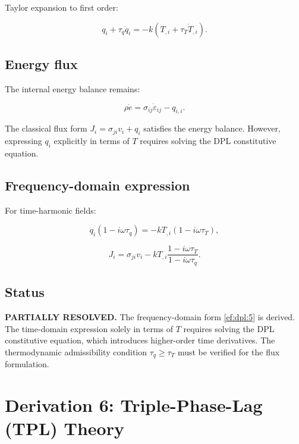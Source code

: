 \documentclass{article}
\begin{document}
Taylor expansion to first order:

\begin{equation}
q_i + \tau_q\dot{q}_i = -k(T_{,i} + \tau_T\dot{T}_{,i}).
\label{ef:dpl:2}
\end{equation}

\subsection{Energy flux}

The internal energy balance remains:

\begin{equation}
\rho\dot{e} = \sigma_{ij}\dot{\varepsilon}_{ij} - q_{i,i}.
\label{ef:dpl:3}
\end{equation}

The classical flux form $J_i = \sigma_{ji}v_i + q_i$ satisfies the energy balance. However, expressing $q_i$ explicitly in terms of $T$ requires solving the DPL constitutive equation.

\subsection{Frequency-domain expression}

For time-harmonic fields:

\begin{equation}
q_i(1 - i\omega\tau_q) = -k T_{,i}(1 - i\omega\tau_T),
\label{ef:dpl:4}
\end{equation}

\begin{equation}
J_i = \sigma_{ji}v_i - k T_{,i}\frac{1 - i\omega\tau_T}{1 - i\omega\tau_q}.
\label{ef:dpl:5}
\end{equation}

\subsection{Status}

\textbf{PARTIALLY RESOLVED.} The frequency-domain form \eqref{ef:dpl:5} is derived. The time-domain expression solely in terms of $T$ requires solving the DPL constitutive equation, which introduces higher-order time derivatives. The thermodynamic admissibility condition $\tau_q \geq \tau_T$ must be verified for the flux formulation.

\section{Derivation 6: Triple-Phase-Lag (TPL) Theory}
\end{document}
